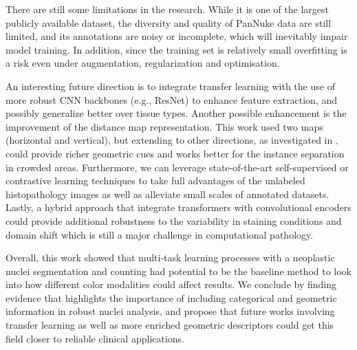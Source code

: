 \documentclass[target=bach,aauheader=,style=]{thud}
\begin{document}
There are still some limitations in the research. While it is one of the largest publicly available dataset, the diversity and quality of PanNuke data are still limited, and its annotations are noisy or incomplete, which will inevitably impair model training. In addition, since the training set is relatively small overfitting is a risk even under augmentation, regularization and optimisation.

An interesting future direction is to integrate transfer learning with the use of more robust CNN backbones (e.g., ResNet) to enhance feature extraction, and possibly generalize better over tissue types. Another possible enhancement is the improvement of the distance map representation. This work used two maps (horizontal and vertical), but extending to other directions, as investigated in \cite{Schmidt_2018}, could provide richer geometric cues and works better for the instance separation in crowded areas. Furthermore, we can leverage state-of-the-art self-supervised or contrastive learning techniques to take full advantages of the unlabeled histopathology images as well as alleviate small scales of annotated datasets. Lastly, a hybrid approach that integrate transformers with convolutional encoders could provide additional robustness to the variability in staining conditions and domain shift which is still a major challenge in computational pathology.

Overall, this work showed that multi-task learning processes with a neoplastic nuclei segmentation and counting had potential to be the baseline method to look into how different color modalities could affect results. We conclude by finding evidence that highlights the importance of including categorical and geometric information in robust nuclei analysis, and propose that future works involving transfer learning as well as more enriched geometric descriptors could get this field closer to reliable clinical applications.


\end{document}
